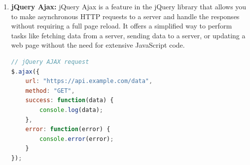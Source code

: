 \documentclass[11pt]{article}
\begin{document}
\begin{enumerate}
    \item \textbf{jQuery Ajax:} jQuery Ajax is a feature in the jQuery library that allows you to make asynchronous HTTP requests to a server and handle the responses without requiring a full page reload. It offers a simplified way to perform tasks like fetching data from a server, sending data to a server, or updating a web page without the need for extensive JavaScript code.

          \begin{lstlisting}[language=JavaScript, caption=Example: AJAX Request]
// jQuery AJAX request
$.ajax({
    url: "https://api.example.com/data",
    method: "GET",
    success: function(data) {
        console.log(data);
    },
    error: function(error) {
        console.error(error);
    }
});
        \end{lstlisting}
\end{enumerate}
\end{document}
